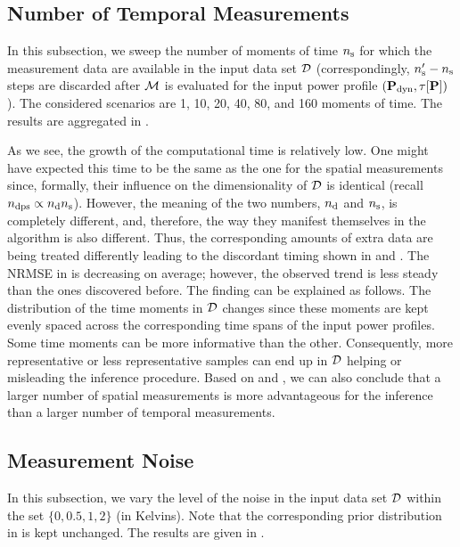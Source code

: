 \subsection{Number of Temporal Measurements}
In this subsection, we sweep the number of moments of time ${n_\text{s}}$ for which the measurement data are available in the input data set $\mathcal{D}$ (correspondingly, ${n_\text{s}'} - {n_\text{s}}$ steps are discarded after $\model$ is evaluated for the input power profile $(\mathbf{P}_{\text{dyn}}, \tau[\mathbf{P}])$). The considered scenarios are 1, 10, 20, 40, 80, and 160 moments of time. The results are aggregated in .


As we see, the growth of the computational time is relatively low. One might have expected this time to be the same as the one for the spatial measurements since, formally, their influence on the dimensionality of $\mathcal{D}$ is identical (recall ${n_\text{dps}} \propto {n_{\text{d}}} {n_\text{s}}$). However, the meaning of the two numbers, ${n_{\text{d}}}$ and ${n_\text{s}}$, is completely different, and, therefore, the way they manifest themselves in the algorithm is also different. Thus, the corresponding amounts of extra data are being treated differently leading to the discordant timing shown in  and .
The NRMSE in  is decreasing on average; however, the observed trend is less steady than the ones discovered before. The finding can be explained as follows. The distribution of the time moments in $\mathcal{D}$ changes since these moments are kept evenly spaced across the corresponding time spans of the input power profiles. Some time moments can be more informative than the other. Consequently, more representative or less representative samples can end up in $\mathcal{D}$ helping or misleading the inference procedure.
Based on  and , we can also conclude that a larger number of spatial measurements is more advantageous for the inference than a larger number of temporal measurements.

\subsection{Measurement Noise}
In this subsection, we vary the level of the noise in the input data set $\mathcal{D}$ within the set $\{ 0, 0.5, 1, 2 \}$ (in Kelvins). Note that the corresponding prior distribution in  is kept unchanged. The results are given in .


